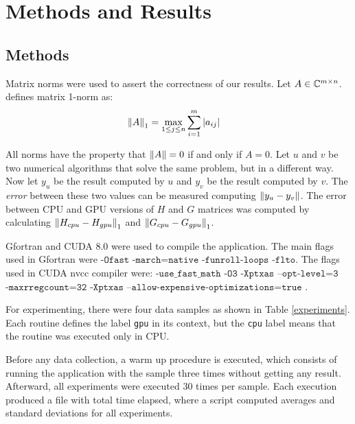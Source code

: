 \chapter{Methods and Results}
\label{cap:results}

\section{Methods}
\label{sec:methods}

Matrix norms were used to assert the correctness of our results. 
Let %
$A \in \mathbb{C}^{m \times n}$. \cite{watkins:2004} defines  
matrix 1-norm as:
\begin{equation}
	\left\lVert A\right\rVert_{   1  } = \max\limits_{1 \leq j \leq n} \sum_{i=1}^{m} |a_{ij}| \quad
\end{equation}

All norms have the property that $\left\lVert A\right\rVert = 0$ if and only if $A = 0$.
Let $u$ and $v$ be two numerical 
algorithms that solve the same problem, but in a different way. 
Now let $y_u$ be the result computed by $u$ and $y_v$ be the result computed by
$v$. The \textit{error} between these two values can be measured computing
$\left\lVert y_u - y_v\right\rVert$. The error between CPU and GPU versions of $H$ and $G$ matrices was computed by calculating $\left\lVert H_{cpu} - H_{gpu}\right\rVert_1$
and $\left\lVert G_{cpu} - G_{gpu}\right\rVert_1$.

Gfortran and CUDA 8.0 were used to compile the application. The main flags used in Gfortran were
$\texttt{-Ofast}$ $\texttt{-march=native}$ $\texttt{-funroll-loops}$ $\texttt{-flto}$. The flags used in
CUDA nvcc compiler were: $\texttt{-use\_fast\_math}$  $\texttt{-O3}$ $\texttt{-Xptxas}$ $\texttt{--opt-level=3}$ \\
$\texttt{-maxrregcount=32}$ $\texttt{-Xptxas}$ 
$\texttt{--allow-expensive-optimizations=true}$ . 

For experimenting, there were four data samples as shown in Table \ref{experiments}. Each routine defines 
the label \texttt{gpu} in its context, but the \texttt{cpu} label means that the routine was executed only in CPU. 

Before any data collection, a warm up procedure is executed, which consists of running the 
application with the sample three times without getting any result. Afterward, all experiments 
were executed 30 times per sample. Each execution produced a file with total time elapsed, 
where a script computed averages and standard deviations for all experiments.

